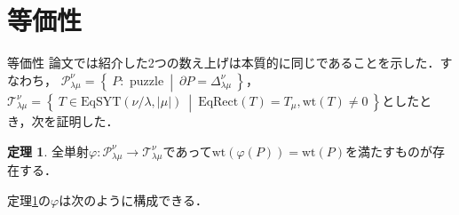 \documentclass[unicode,12pt]{beamer}%
\theoremstyle{definition}
\newtheorem{theo}[defin]{定理}
\theoremstyle{example}
\newcommand{\set}[2]{\left\{\:#1\:\middle|\:#2\:\right\}}
\begin{document}
\section[]{等価性}

\begin{frame}{等価性}
  論文では紹介した2つの数え上げは本質的に同じであることを示した．すなわち，
  $\mathcal{P}^\nu_{\lambda\mu}=\set{P:\text{ puzzle}}{\partial P = \Delta^\nu_{\lambda\mu}}$，$\mathcal{T}^\nu_{\lambda\mu} = \set{T\in\text{EqSYT}(\nu/\lambda,|\mu|)}{\text{EqRect}(T)=T_\mu,\text{wt}(T)\neq 0}$としたとき，次を証明した．
  \begin{theo}\label{main theorem}
    全単射$\varphi:\mathcal{P}^\nu_{\lambda\mu}\rightarrow \mathcal{T}^\nu_{\lambda\mu}$であって$\text{wt}(\varphi(P))=\text{wt}(P)$を満たすものが存在する．
  \end{theo}
  定理\ref{main theorem}の$\varphi$は次のように構成できる．
\end{frame}
\end{document}
